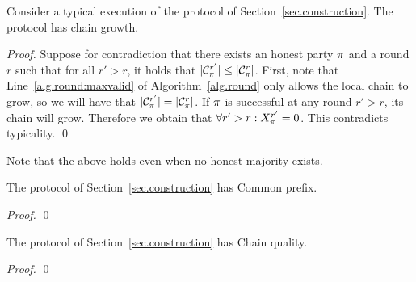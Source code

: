 \begin{theorem}
  Consider a typical execution of the protocol of
  Section~\ref{sec.construction}. The protocol has chain growth.
\end{theorem}
\begin{proof}
  Suppose for contradiction that there exists an honest party $\pi$ and a round $r$
  such that for all $r' > r$, it holds that
  $|\mathcal{C}_\pi^{r'}| \leq |\mathcal{C}_\pi^r|$. First, note that
  Line~\ref{alg.round:maxvalid} of Algorithm~\ref{alg.round} only allows the
  local chain to grow, so we will have that
  $|\mathcal{C}_\pi^{r'}| = |\mathcal{C}_\pi^r|$. If $\pi$ is successful at any
  round $r' > r$, its chain will grow. Therefore we obtain that
  $\forall r' > r: X^{r'}_\pi = 0$. This contradicts typicality.
  \qed
\end{proof}

Note that the above holds even when no honest majority exists.

\begin{theorem}
  The protocol of Section~\ref{sec.construction} has Common prefix.
\end{theorem}
\begin{proof}
  \qed
\end{proof}

\begin{theorem}
  The protocol of Section~\ref{sec.construction} has Chain quality.
\end{theorem}
\begin{proof}
  \qed
\end{proof}
